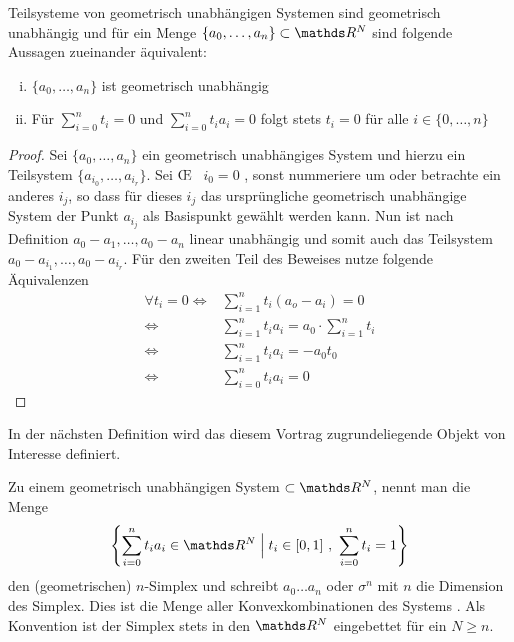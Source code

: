 \begin{Lem}\label{lem:1}
  Teilsysteme von geometrisch unabhängigen Systemen sind geometrisch
  unabhängig und für ein Menge $\{ a_0 , \ldots , a_n \} \subset \R^N$ sind folgende Aussagen zueinander äquivalent:
  \begin{enumerate}[i)]
  	\item $\{ a_0 , \ldots , a_n \}$ ist geometrisch unabhängig
  	\item Für $\sum\limits_{i=0}^n t_i = 0$ und $\sum\limits_{i=0}^n t_i a_i = 0$ folgt stets $t_i = 0$ für alle $i \in \{ 0,\ldots,n\}$
  \end{enumerate}
  \begin{proof}
    Sei $\{ a_0 , \ldots , a_n \}$ ein geometrisch unabhängiges System und hierzu 
    ein Teilsystem $\{ a_{i_0},\ldots,a_{i_r} \}$. 
    Sei \OE~ $i_0 = 0$ , sonst nummeriere um oder betrachte ein anderes $i_j$, so dass für dieses $i_j$ das ursprüngliche geometrisch unabhängige System der Punkt $a_{i_j}$ als Basispunkt gewählt werden kann. Nun ist nach Definition $ a_0 - a_1 , \ldots , a_0 - a_n$ linear unabhängig und somit auch das Teilsystem $ a_0 - a_ {i_1}, \ldots , a_0 - a_{i_r}$.
    Für den zweiten Teil des Beweises nutze folgende Äquivalenzen
		\begin{align*}
			\forall t_i =0 
				\Leftrightarrow
			&\sum\limits_{i=1}^n t_i(a_o - a_i) = 0\\
				\Leftrightarrow
			&\sum\limits_{i=1}^n t_i a_i = a_0 \cdot \sum\limits_{i=1}^n t_i\\
				\Leftrightarrow
			&\sum\limits_{i=1}^n t_i a_i = - a_0 t_0\\
				\Leftrightarrow
			&\sum\limits_{i=0}^n t_i a_i = 0
		\end{align*}
  \end{proof}
\end{Lem}

In der nächsten Definition wird das diesem Vortrag zugrundeliegende Objekt von Interesse definiert.

\begin{Def}
  Zu einem geometrisch unabhängigen System \gs $\subset \R^N$, nennt man die Menge
  \begin{gather*}
    \set{\sum\limits_{i=0}^n t_i a_i \in \R^N}{ t_i \in [0,1] ~,~ \sum\limits_{i=0}^n t_i = 1}
  \end{gather*}
  den (geometrischen) $n$-Simplex und schreibt $a_0 \ldots a_n$ oder $\sigma^n$ mit $n$ die Dimension des Simplex. Dies ist die Menge aller Konvexkombinationen des Systems \gs. Als Konvention 
  ist der Simplex stets in den $\R^N$ eingebettet für ein $N \geq n$.
\end{Def}
 
